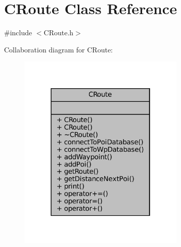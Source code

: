 \hypertarget{classCRoute}{}\section{C\+Route Class Reference}
\label{classCRoute}


{\ttfamily \#include $<$C\+Route.\+h$>$}



Collaboration diagram for C\+Route\+:
\nopagebreak
\begin{figure}[H]
\begin{center}
\leavevmode
\includegraphics[width=226pt]{classCRoute__coll__graph}
\end{center}
\end{figure}
